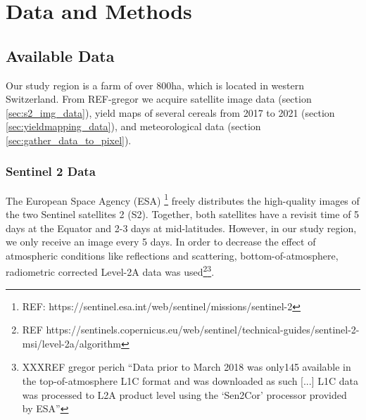 \chapter{Data and Methods}
\section{Available Data}
	{
		Our study region is a farm of over 800ha, which is located in western Switzerland. From REF-gregor we acquire satellite image data (section \ref{sec:s2_img_data}), yield maps of several cereals from 2017 to 2021 (section \ref{sec:yieldmapping_data}), and meteorological data (section \ref{sec:gather_data_to_pixel}).
	}

	\subsection{Sentinel 2 Data}{
		\label{sec:s2_img_data}
		{
			The European Space Agency (ESA) \footnote{REF: https://sentinel.esa.int/web/sentinel/missions/sentinel-2} freely distributes the high-quality images of the two Sentinel satellites 2 (S2). Together, both satellites have a revisit time of 5 days at the Equator and 2-3 days at mid-latitudes. However, in our study region, we only receive an image every 5 days.
			In order to decrease the effect of atmospheric conditions like reflections and scattering, bottom-of-atmosphere, radiometric corrected Level-2A data was used\footnote{REF https://sentinels.copernicus.eu/web/sentinel/technical-guides/sentinel-2-msi/level-2a/algorithm}\footnote{XXXREF gregor perich ``Data prior to March 2018 was only145
			available in the top-of-atmosphere L1C format and was downloaded as such [...] L1C data was processed to L2A product level using the `Sen2Cor' processor provided by ESA''}. 
		}

}
